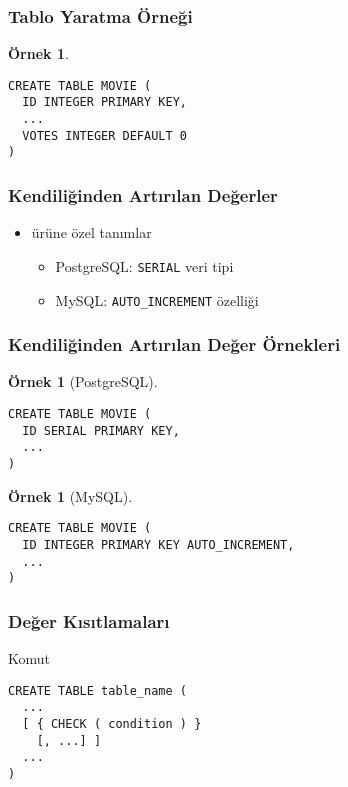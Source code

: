 \documentclass[dvipsnames]{beamer}
\theoremstyle{definition}
\theoremstyle{example}
\newtheorem{ornek}[theorem]{Örnek}
\theoremstyle{plain}
\begin{document}
\begin{frame}[fragile]
  \frametitle{Tablo Yaratma Örneği}

  \begin{ornek}
    \begin{lstlisting}
CREATE TABLE MOVIE (
  ID INTEGER PRIMARY KEY,
  ...
  VOTES INTEGER DEFAULT 0
)
    \end{lstlisting}
  \end{ornek}
\end{frame}

\begin{frame}[fragile]
  \frametitle{Kendiliğinden Artırılan Değerler}

  \begin{itemize}
    \item ürüne özel tanımlar
    \begin{itemize}
      \item PostgreSQL: \texttt{SERIAL} veri tipi
      \item MySQL: \texttt{AUTO\_INCREMENT} özelliği
    \end{itemize}
  \end{itemize}
\end{frame}

\begin{frame}[fragile]
  \frametitle{Kendiliğinden Artırılan Değer Örnekleri}

  \begin{ornek}[PostgreSQL]
    \begin{lstlisting}
CREATE TABLE MOVIE (
  ID SERIAL PRIMARY KEY,
  ...
)
    \end{lstlisting}
  \end{ornek}

  \pause
  \begin{ornek}[MySQL]
    \begin{lstlisting}
CREATE TABLE MOVIE (
  ID INTEGER PRIMARY KEY AUTO_INCREMENT,
  ...
)
    \end{lstlisting}
  \end{ornek}
\end{frame}

\begin{frame}[fragile]
  \frametitle{Değer Kısıtlamaları}

  \begin{block}{Komut}
    \begin{lstlisting}
CREATE TABLE table_name (
  ...
  [ { CHECK ( condition ) }
    [, ...] ]
  ...
)
    \end{lstlisting}
  \end{block}
\end{frame}
\end{document}
